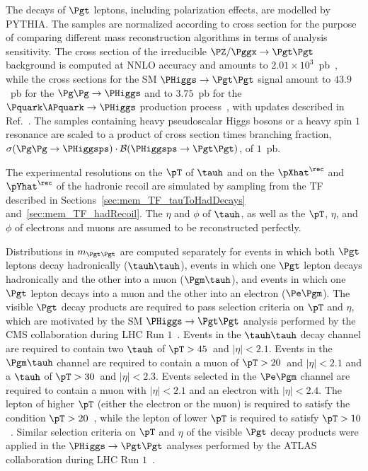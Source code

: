 The decays of $\Pgt$ leptons, including polarization effects, are modelled by PYTHIA.
The samples are normalized according to cross section for the purpose of comparing different mass reconstruction algorithms in terms of analysis sensitivity.
The cross section of the irreducible $\PZ/\Pggx \to \Pgt\Pgt$ background is computed at NNLO accuracy and amounts to $2.01 \times 10^{3}$~pb~\cite{FEWZ},
while the cross sections for the SM $\PHiggs \to \Pgt\Pgt$ signal 
amount to $43.9$~pb for the $\Pg\Pg \to \PHiggs$ and to $3.75$~pb for the $\Pquark\APquark \to \PHiggs$ production process~\cite{Dittmaier:2011ti}, 
with updates described in Ref.~\cite{Heinemeyer:2013tqa}.
The samples containing heavy pseudoscalar Higgs bosons or a heavy spin $1$
resonance are scaled to a product of cross section times branching fraction, 
$\sigma(\Pg\Pg \to \PHiggsps) \cdot \mathcal{B}(\PHiggsps \to \Pgt\Pgt)$, of $1$~pb.

The experimental resolutions on the $\pT$ of $\tauh$ and on the $\pXhat^{\rec}$ and $\pYhat^{\rec}$ of the hadronic recoil 
are simulated by sampling from the TF described in
Sections~\ref{sec:mem_TF_tauToHadDecays}
and~\ref{sec:mem_TF_hadRecoil}.
The $\eta$ and $\phi$ of $\tauh$,
as well as the $\pT$, $\eta$, and $\phi$ of electrons and muons are assumed to be reconstructed perfectly.

Distributions in $m_{\Pgt\Pgt}$ are computed separately for events in which 
both $\Pgt$ leptons decay hadronically ($\tauh\tauh$), 
events in which one $\Pgt$ lepton decays hadronically and the other into a muon ($\Pgm\tauh$),
and events in which one $\Pgt$ lepton decays into a muon and the other into an electron ($\Pe\Pgm$).
The visible $\Pgt$ decay products are required to pass selection criteria on $\pT$ and $\eta$,
which are motivated by the SM $\PHiggs \to \Pgt\Pgt$ analysis performed by the CMS collaboration during LHC Run $1$~\cite{HIG-13-004}.
Events in the $\tauh\tauh$ decay channel are required to contain
two $\tauh$ of $\pT > 45$~\GeV and $\vert\eta\vert < 2.1$.
Events in the $\Pgm\tauh$ channel
are required to contain a muon of $\pT > 20$~\GeV and $\vert\eta\vert < 2.1$ and a $\tauh$ of $\pT > 30$~\GeV and $\vert\eta\vert < 2.3$.
Events selected in the $\Pe\Pgm$ channel are required to contain a muon with $\vert\eta\vert < 2.1$ and an electron with $\vert\eta\vert < 2.4$.
The lepton of higher $\pT$ (either the electron or the muon) is required to satisfy the condition $\pT > 20$~\GeV,
while the lepton of lower $\pT$ is required to satisfy $\pT > 10$~\GeV.
Similar selection criteria on $\pT$ and $\eta$ of the visible $\Pgt$ decay products were applied in the $\PHiggs \to \Pgt\Pgt$
analyses performed by the ATLAS
collaboration during LHC Run $1$~\cite{ATLAS_HiggsTauTau_SM,ATLAS_HiggsTauTau_MSSM}.

